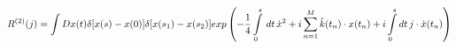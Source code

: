 \begin{equation}
R^{(2)}(j)=\int Dx(t)\delta[x(s)-x(0)]\delta[x(s_1)-x(s_2)]exp\left(-{1\over 4}
\int\limits_0^s\,dt\,\dot{x}^2+i\sum\limits_{n=1}^M
\hat{k}(t_n)\cdot x(t_n)+i\int\limits_0^s dt\,j\cdot \dot{x}(t_n)\right )
\end{equation}

